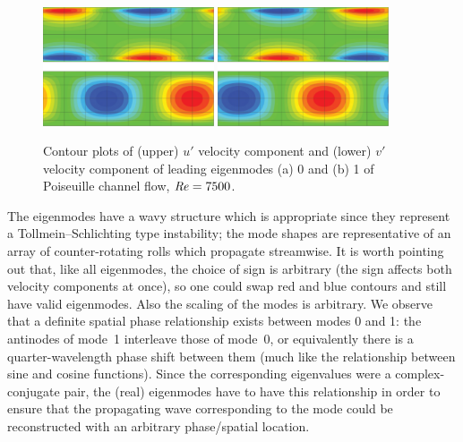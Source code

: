 \documentclass[11pt,a4paper]{report}
\newcommand\Rey{\mbox{\textit{Re}}}
\begin{document}
\begin{figure}
\begin{center}
\includegraphics[width=0.45\textwidth]{export0.pdf}
\includegraphics[width=0.45\textwidth]{export1.pdf}
\end{center}
\caption{Contour plots of (upper) $u'$ velocity component and (lower)
  $v'$ velocity component of leading eigenmodes (a) 0 and (b) 1 of
  Poiseuille channel flow, $\Rey=7500$.}
\label{fig.chanmodes}
\end{figure}

The eigenmodes have a wavy structure which is appropriate since they
represent a Tollmein--Schlichting type instability; the mode shapes
are representative of an array of counter-rotating rolls which
propagate streamwise.  It is worth pointing out that, like all
eigenmodes, the choice of sign is arbitrary (the sign affects both
velocity components at once), so one could swap red and blue contours
and still have valid eigenmodes.  Also the scaling of the modes is
arbitrary.  We observe that a definite spatial phase relationship
exists between modes 0 and 1: the antinodes of mode~1 interleave those
of mode~0, or equivalently there is a quarter-wavelength phase shift
between them (much like the relationship between sine and cosine
functions).  Since the corresponding eigenvalues were a
complex-conjugate pair, the (real) eigenmodes have to have this
relationship in order to ensure that the propagating wave
corresponding to the mode could be reconstructed with an arbitrary
phase/spatial location.
\end{document}

